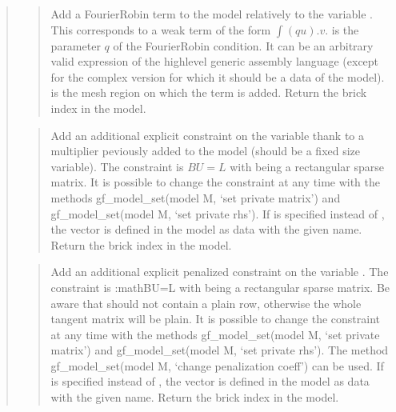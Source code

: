 \documentclass[a4paper,11pt,english]{sphinxmanual}
\begin{document}
\begin{quote}
\begin{quote}
\sphinxAtStartPar
Add a Fourier\sphinxhyphen{}Robin term to the model relatively to the variable
. This corresponds to a weak term of the form
\(\int (qu).v\).  is the parameter \(q\) of
the Fourier\sphinxhyphen{}Robin condition.  It can be an arbitrary valid expression
of the high\sphinxhyphen{}level generic assembly language (except for the complex version
for which it should be a data of the model).  is the mesh region
on which the term is added. Return the brick index in the model.
\end{quote}

\sphinxAtStartPar
{}
\begin{quote}

\sphinxAtStartPar
Add an additional explicit constraint on the variable  thank to
a multiplier  peviously added to the model (should be a fixed
size variable). The constraint is \(BU=L\)
with  being a rectangular sparse matrix. It is possible to change
the constraint at any time with the methods gf\_model\_set(model M, ‘set private matrix’)
and gf\_model\_set(model M, ‘set private rhs’). If  is specified instead of ,
the vector  is defined in the model as data with the given name.
Return the brick index in the model.
\end{quote}

\sphinxAtStartPar
{}
\begin{quote}

\sphinxAtStartPar
Add an additional explicit penalized constraint on the variable .
The constraint is :math\textasciigrave{}BU=L\textasciigrave{} with  being a rectangular sparse matrix.
Be aware that  should not contain a plain row, otherwise the whole
tangent matrix will be plain. It is possible to change the constraint
at any time with the methods gf\_model\_set(model M, ‘set private matrix’)
and gf\_model\_set(model M, ‘set private rhs’). The method
gf\_model\_set(model M, ‘change penalization coeff’) can be used.
If  is specified instead of , the vector  is defined
in the model as data with the given name.
Return the brick
index in the model.
\end{quote}


\end{quote}
\end{document}
